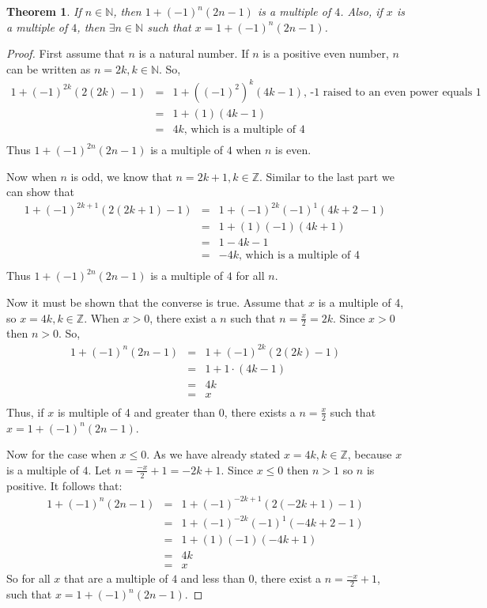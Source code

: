 \documentclass{article}
\newtheorem{theorem}{Theorem}
\begin{document}
\pagebreak
\begin{theorem}
    If $n\in \mathbb{N}$, then $1 + (-1)^n(2n-1)$ is a multiple of $4$. Also, if $x$ is a multiple of $4$, then $\exists n \in \mathbb{N}$ such that $x= 1 + (-1)^n(2n-1)$.
\end{theorem}

\begin{proof}
    First assume that $n$ is a natural number. If $n$ is a positive even number, $n$ can be written as $n=2k, k\in \mathbb{N}$. So,
    \begin{eqnarray*}
        1 + (-1)^{2k}(2(2k)-1)&=&1 + \left(\left(-1\right)^2\right)^k(4k-1)\text{, -1 raised to an even power equals 1}\\
        &=&1 + (1)(4k-1)\\
        &=&4k\text{, which is a multiple of $4$}\\
    \end{eqnarray*}
    Thus $1 + (-1)^{2n}(2n-1) $ is a multiple of $4$ when $n$ is even.
    
    Now when $n$ is odd, we know that $n=2k+1, k\in\mathbb{Z}$. Similar to the last part we can show that
    \begin{eqnarray*}
        1 + (-1)^{2k+1}(2(2k+1)-1)&=&1 + (-1)^{2k}(-1)^1(4k+2-1)\\
        &=&1 + (1)(-1)(4k+1)\\
        &=&1 - 4k-1\\
        &=&-4k\text{, which is a multiple of $4$}\\
    \end{eqnarray*}
    Thus $1 + (-1)^{2n}(2n-1) $ is a multiple of $4$ for all $n$.
    
    Now it must be shown that the converse is true. Assume that $x$ is a multiple of 4, so $x = 4k, k \in \mathbb{Z}$. When $x>0$, there exist a $n$ such that $n = \frac{x}{2} = 2k$. Since $x>0$ then $n>0$. So, 
    \begin{eqnarray*}
    1 + (-1)^n(2n-1)&=& 1 + (-1)^{2k}(2(2k)-1)\\
    &=& 1 + 1\cdot(4k-1)\\
    &=&4k\\
    &=&x\\
    \end{eqnarray*}
    Thus, if $x$ is multiple of 4 and greater than $0$, there exists a $n = \frac{x}{2}$ such that $x= 1 + (-1)^n(2n-1)$.
    
    Now for the case when $x\leq 0$. As we have already stated $x = 4k, k\in\mathbb{Z}$, because $x$ is a multiple of $4$. Let $n = \frac{-x}{2} + 1 = -2k + 1$. Since $x\leq0$ then $n>1$ so $n$ is positive. It follows that:
    \begin{eqnarray*}
    1 + (-1)^n(2n-1)&=& 1 + (-1)^{-2k + 1}(2(-2k + 1)-1)\\
    &=& 1+ (-1)^{-2k}(-1)^1(-4k+2-1)\\
    &=& 1 + (1)(-1)(-4k+1)\\
    &=& 4k\\
    &=& x
    \end{eqnarray*}
    So for all $x$ that are a multiple of $4$ and less than $0$, there exist a $n = \frac{-x}{2} + 1$, such that $x= 1 + (-1)^n(2n-1)$. 
    

\end{proof}
\end{document}
